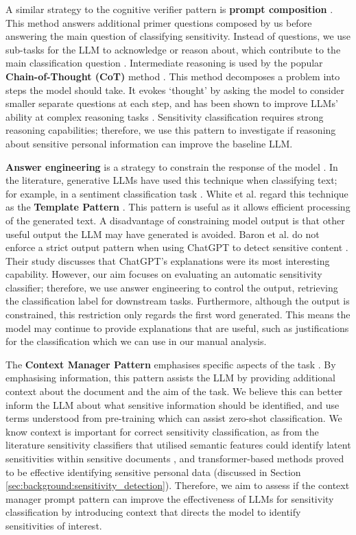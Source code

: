 A similar strategy to the cognitive verifier pattern is \textbf{prompt composition} \cite{liu2023pre}. This method answers additional primer questions composed by us before answering the main question of classifying sensitivity. Instead of questions, we use sub-tasks for the LLM to acknowledge or reason about, which contribute to the main classification question \cite{han2022ptr}. Intermediate reasoning is used by the popular \textbf{Chain-of-Thought (CoT)} method \cite{wei2022chain, fei2023reasoning}. This method decomposes a problem into steps the model should take. It evokes ‘thought’ by asking the model to consider smaller separate questions at each step, and has been shown to improve LLMs' ability at complex reasoning tasks \cite{wei2022chain}. Sensitivity classification requires strong reasoning capabilities; therefore, we use this pattern to investigate if reasoning about sensitive personal information can improve the baseline LLM.

\textbf{Answer engineering} is a strategy to constrain the response of the model \cite{liu2023pre}. In the literature, generative LLMs have used this technique when classifying text; for example, in a sentiment classification task \cite{yin2019benchmarking, kocon2023chatgpt}. White et al. regard this technique as the \textbf{Template Pattern} \cite{white2023prompt}. This pattern is useful as it allows efficient processing of the generated text. A disadvantage of constraining model output is that other useful output the LLM may have generated is avoided. Baron et al. do not enforce a strict output pattern when using ChatGPT to detect sensitive content \cite{baron2023using}. Their study discusses that ChatGPT's explanations were its most interesting capability. However, our aim focuses on evaluating an automatic sensitivity classifier; therefore, we use answer engineering to control the output, retrieving the classification label for downstream tasks. Furthermore, although the output is constrained, this restriction only regards the first word generated. This means the model may continue to provide explanations that are useful, such as justifications for the classification which we can use in our manual analysis.

The \textbf{Context Manager Pattern} emphasises specific aspects of the task \cite{white2023prompt}. By emphasising information, this pattern assists the LLM by providing additional context about the document and the aim of the task. We believe this can better inform the LLM about what sensitive information should be identified, and use terms understood from pre-training which can assist zero-shot classification. We know context is important for correct sensitivity classification, as from the literature sensitivity classifiers that utilised semantic features could identify latent sensitivities within sensitive documents \cite{mcdonald2017enhancing}, and transformer-based methods proved to be effective identifying sensitive personal data \cite{gambarelli2023your} (discussed in Section \ref{sec:background:sensitivity_detection}). Therefore, we aim to assess if the context manager prompt pattern can improve the effectiveness of LLMs for sensitivity classification by introducing context that directs the model to identify sensitivities of interest.

